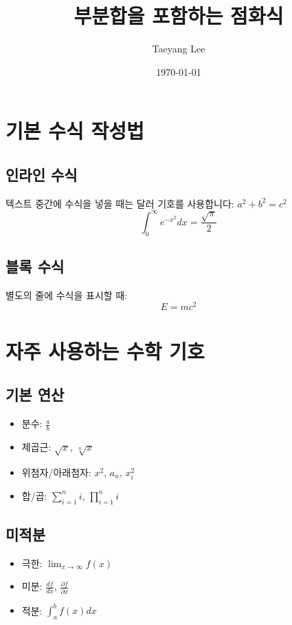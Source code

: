 \documentclass[12pt,a4paper]{article}
\title{부분합을 포함하는 점화식}
\author{Taeyang Lee}
\date{\today}
\begin{document}
\maketitle
\tableofcontents  %
\newpage

\section{기본 수식 작성법}

\subsection{인라인 수식}

텍스트 중간에 수식을 넣을 때는 달러 기호를 사용합니다: $a^2 + b^2 = c^2$
\begin{equation}
    \int_{0}^{\infty} e^{-x^2} dx = \frac{\sqrt{\pi}}{2}
\end{equation}

\subsection{블록 수식}
별도의 줄에 수식을 표시할 때:
\[
    E = mc^2
\]


\section{자주 사용하는 수학 기호}

\subsection{기본 연산}
\begin{itemize}
    \item 분수: $\frac{a}{b}$
    \item 제곱근: $\sqrt{x}$, $\sqrt[n]{x}$
    \item 위첨자/아래첨자: $x^2$, $a_n$, $x_i^2$
    \item 합/곱: $\sum_{i=1}^{n} i$, $\prod_{i=1}^{n} i$
\end{itemize}

\subsection{미적분}
\begin{itemize}
    \item 극한: $\lim_{x \to \infty} f(x)$
    \item 미분: $\frac{df}{dx}$, $\frac{\partial f}{\partial x}$
    \item 적분: $\int_{a}^{b} f(x) dx$
\end{itemize}
\end{document}
